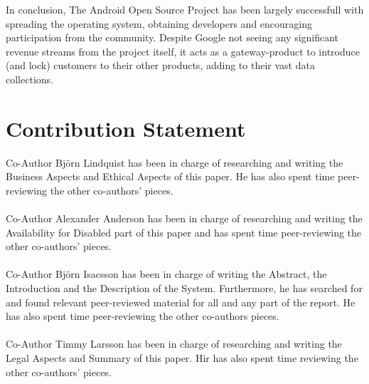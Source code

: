 \documentclass[conference]{IEEEtran}
\begin{document}
In conclusion, The Android Open Source Project has been largely successfull with spreading the operating system, obtaining developers and encouraging participation from the community. Despite Google not seeing any significant revenue streams from the project itself, it acts as a gateway-product to introduce (and lock) customers to their other products, adding to their vast data collections.


\section{Contribution Statement}

Co-Author Björn Lindquist has been in charge of researching and writing the Business Aspects and Ethical Aspects of this paper. He has also spent time peer-reviewing the other co-authors' pieces.
\\
\\
Co-Author Alexander Anderson has been in charge of researching and writing the Availability for Disabled part of this paper and has spent time peer-reviewing the other co-authors' pieces.
\\
\\
Co-Author Björn Isacsson has been in charge of writing the Abstract, the Introduction and the Description of the System. Furthermore, he has searched for and found relevant peer-reviewed material for all and any part of the report. He has also spent time peer-reviewing the other co-authors pieces. 
\\
\\
Co-Author Timmy Larsson has been in charge of researching and writing the Legal Aspects and Summary of this paper. Hir has also spent time reviewing the other co-authors' pieces.
\end{document}
